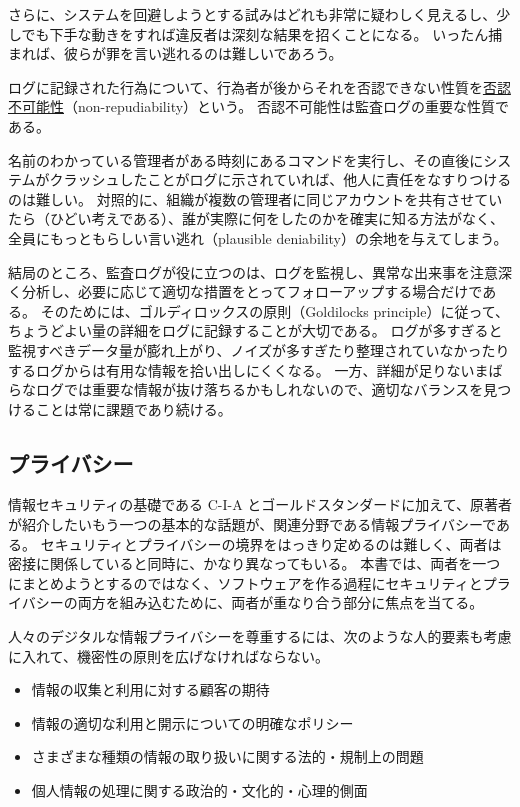 \documentclass[uplatex]{jsarticle}
\def\label#1{}%
\begin{document}
さらに、システムを回避しようとする試みはどれも非常に疑わしく見えるし、少しでも下手な動きをすれば違反者は深刻な結果を招くことになる。
いったん捕まれば、彼らが罪を言い逃れるのは難しいであろう。

\begin{dfn}[否認不可能性]\label{dfn:ch1-non-repudiability}
ログに記録された行為について、行為者が後からそれを否認できない性質を\underline{否認不可能性}（non-repudiability）という。
否認不可能性は監査ログの重要な性質である。
\end{dfn}

名前のわかっている管理者がある時刻にあるコマンドを実行し、その直後にシステムがクラッシュしたことがログに示されていれば、他人に責任をなすりつけるのは難しい。
対照的に、組織が複数の管理者に同じアカウントを共有させていたら（ひどい考えである）、誰が実際に何をしたのかを確実に知る方法がなく、全員にもっともらしい言い逃れ（plausible deniability）の余地を与えてしまう。

結局のところ、監査ログが役に立つのは、ログを監視し、異常な出来事を注意深く分析し、必要に応じて適切な措置をとってフォローアップする場合だけである。
そのためには、ゴルディロックスの原則（Goldilocks principle）に従って、ちょうどよい量の詳細をログに記録することが大切である。
ログが多すぎると監視すべきデータ量が膨れ上がり、ノイズが多すぎたり整理されていなかったりするログからは有用な情報を拾い出しにくくなる。
一方、詳細が足りないまばらなログでは重要な情報が抜け落ちるかもしれないので、適切なバランスを見つけることは常に課題であり続ける。

\subsection{プライバシー}

情報セキュリティの基礎である C-I-A とゴールドスタンダードに加えて、原著者が紹介したいもう一つの基本的な話題が、関連分野である情報プライバシーである。
セキュリティとプライバシーの境界をはっきり定めるのは難しく、両者は密接に関係していると同時に、かなり異なってもいる。
本書では、両者を一つにまとめようとするのではなく、ソフトウェアを作る過程にセキュリティとプライバシーの両方を組み込むために、両者が重なり合う部分に焦点を当てる。

人々のデジタルな情報プライバシーを尊重するには、次のような人的要素も考慮に入れて、機密性の原則を広げなければならない。
\begin{itemize}
\item 情報の収集と利用に対する顧客の期待
\item 情報の適切な利用と開示についての明確なポリシー
\item さまざまな種類の情報の取り扱いに関する法的・規制上の問題
\item 個人情報の処理に関する政治的・文化的・心理的側面
\end{itemize}
\end{document}
